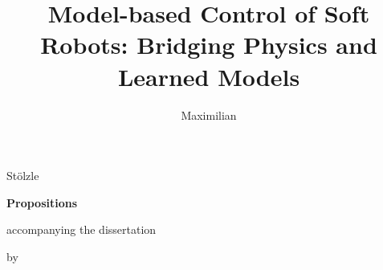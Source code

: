 \documentclass{propositions}
\begin{document}
\title{Model-based Control of Soft Robots: Bridging Physics and Learned Models}
\author{Maximilian}{Stölzle}

\begin{center}

{\Large\titlefont\bfseries Propositions}

\medskip

accompanying the dissertation

\medskip

{\makeatletter
\titlestyle\bfseries\large\@title
\makeatother}

{\makeatletter
\ifx\@subtitle\undefined\else
    \titlefont\titleshape\@subtitle
\fi
\makeatother}

\medskip

by

\medskip

\makeatletter
{\large\titlefont\bfseries\@firstname\ {\titleshape\@lastname}}
\makeatother

\end{center}

\bigskip
\end{document}
